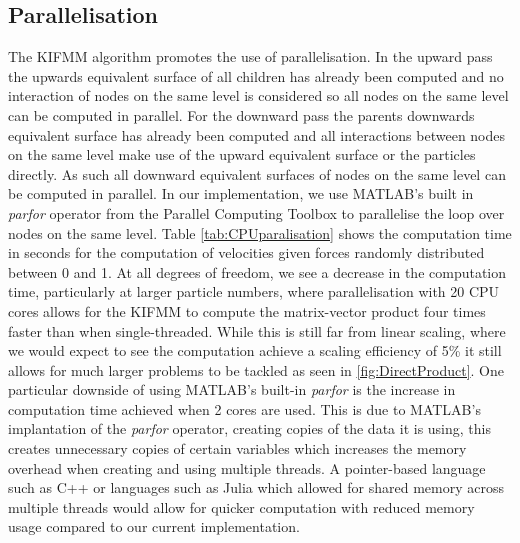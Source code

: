 \subsection{Parallelisation}
The KIFMM algorithm promotes the use of parallelisation. In the upward pass the upwards equivalent surface of all children has already been computed and no interaction of nodes on the same level is considered so all nodes on the same level can be computed in parallel. For the downward pass the parents downwards equivalent surface has already been computed and all interactions between nodes on the same level make use of the upward equivalent surface or the particles directly. As such all downward equivalent surfaces of nodes on the same level can be computed in parallel. In our implementation, we use MATLAB's built in \textit{parfor} operator from the Parallel Computing Toolbox to parallelise the loop over nodes on the same level. Table \ref{tab:CPUparalisation} shows the computation time in seconds for the computation of velocities given forces randomly distributed between 0 and 1. At all degrees of freedom, we see a decrease in the computation time, particularly at larger particle numbers, where parallelisation with 20 CPU cores allows for the KIFMM to compute the matrix-vector product four times faster than when single-threaded. While this is still far from linear scaling, where we would expect to see the computation achieve a scaling efficiency of 5\% it still allows for much larger problems to be tackled as seen in \cref{fig:DirectProduct}. One particular downside of using MATLAB's built-in \textit{parfor} is the increase in computation time achieved when 2 cores are used. This is due to MATLAB's implantation of the \textit{parfor} operator, creating copies of the data it is using, this creates unnecessary copies of certain variables which increases the memory overhead when creating and using multiple threads. A pointer-based language such as C++ or languages such as Julia which allowed for shared memory across multiple threads would allow for quicker computation with reduced memory usage compared to our current implementation.

